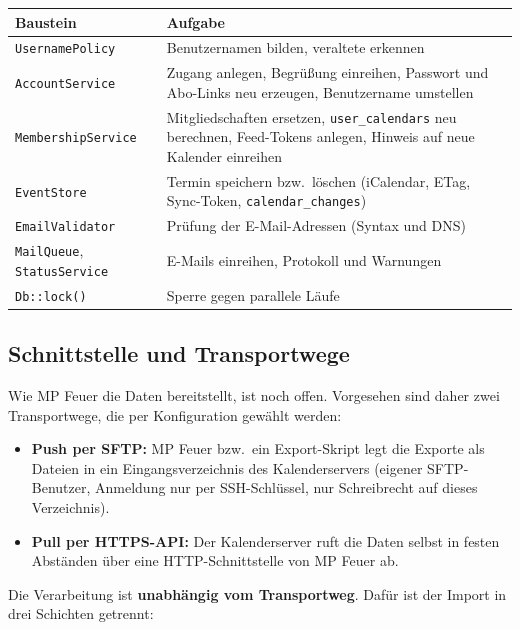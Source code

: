 \documentclass[a4paper,fontsize=10pt]{scrartcl}
\newcommand{\code}[1]{\texttt{#1}}
\begin{document}
\begin{center}
\begin{tabularx}{\textwidth}{L{5.4cm}X}
\toprule
\textbf{Baustein} & \textbf{Aufgabe} \\
\midrule
\code{UsernamePolicy} & Benutzernamen bilden, veraltete erkennen \\
\code{AccountService} & Zugang anlegen, Begrüßung einreihen, Passwort und
                        Abo-Links neu erzeugen, Benutzername umstellen \\
\code{MembershipService} & Mitgliedschaften ersetzen,
                        \code{user\_calendars} neu berechnen, Feed-Tokens
                        anlegen, Hinweis auf neue Kalender einreihen \\
\code{EventStore} & Termin speichern bzw.\ löschen (iCalendar, ETag,
                        Sync-Token, \code{calendar\_changes}) \\
\code{EmailValidator} & Prüfung der E-Mail-Adressen (Syntax und DNS) \\
\code{MailQueue}, \code{StatusService} & E-Mails einreihen, Protokoll und
                        Warnungen \\
\code{Db::lock()} & Sperre gegen parallele Läufe \\
\bottomrule
\end{tabularx}
\end{center}

\subsection{Schnittstelle und Transportwege}

Wie MP Feuer die Daten bereitstellt, ist noch offen. Vorgesehen sind daher
zwei Transportwege, die per Konfiguration gewählt werden:

\begin{itemize}
  \item \textbf{Push per SFTP:} MP Feuer bzw.\ ein Export-Skript legt die
        Exporte als Dateien in ein Eingangsverzeichnis des Kalenderservers
        (eigener SFTP-Benutzer, Anmeldung nur per SSH-Schlüssel, nur
        Schreibrecht auf dieses Verzeichnis).
  \item \textbf{Pull per HTTPS-API:} Der Kalenderserver ruft die Daten
        selbst in festen Abständen über eine HTTP-Schnittstelle von MP Feuer
        ab.
\end{itemize}

Die Verarbeitung ist \textbf{unabhängig vom Transportweg}. Dafür ist der
Import in drei Schichten getrennt:
\end{document}
